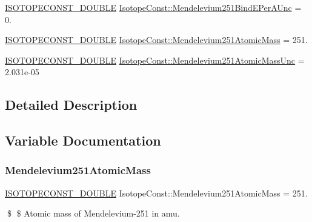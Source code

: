 \begin{DoxyCompactItemize}
\item 
\mbox{\hyperlink{group___isotope_const-_macros_ga8f45a7272ce02c0b4c65c44636ed719a}{I\+S\+O\+T\+O\+P\+E\+C\+O\+N\+S\+T\+\_\+\+D\+O\+U\+B\+LE}} \mbox{\hyperlink{group___isotope_const-_mendelevium-_md251_ga653bd7092f12763e25730c8b7e0113b8}{Isotope\+Const\+::\+Mendelevium251\+Bind\+E\+Per\+A\+Unc}} = 0.
\item 
\mbox{\hyperlink{group___isotope_const-_macros_ga8f45a7272ce02c0b4c65c44636ed719a}{I\+S\+O\+T\+O\+P\+E\+C\+O\+N\+S\+T\+\_\+\+D\+O\+U\+B\+LE}} \mbox{\hyperlink{group___isotope_const-_mendelevium-_md251_gaf84003f2ed6b6af5a3ca6591a2b3a733}{Isotope\+Const\+::\+Mendelevium251\+Atomic\+Mass}} = 251.
\item 
\mbox{\hyperlink{group___isotope_const-_macros_ga8f45a7272ce02c0b4c65c44636ed719a}{I\+S\+O\+T\+O\+P\+E\+C\+O\+N\+S\+T\+\_\+\+D\+O\+U\+B\+LE}} \mbox{\hyperlink{group___isotope_const-_mendelevium-_md251_ga7b61f57baacad898c83fb0f0a25c0f25}{Isotope\+Const\+::\+Mendelevium251\+Atomic\+Mass\+Unc}} = 2.\+031e-\/05
\end{DoxyCompactItemize}


\subsection{Detailed Description}


\subsection{Variable Documentation}
\mbox{\label{group___isotope_const-_mendelevium-_md251_gaf84003f2ed6b6af5a3ca6591a2b3a733}} 
\subsubsection{\texorpdfstring{Mendelevium251\+Atomic\+Mass}{Mendelevium251AtomicMass}}
{\footnotesize\ttfamily \mbox{\hyperlink{group___isotope_const-_macros_ga8f45a7272ce02c0b4c65c44636ed719a}{I\+S\+O\+T\+O\+P\+E\+C\+O\+N\+S\+T\+\_\+\+D\+O\+U\+B\+LE}} Isotope\+Const\+::\+Mendelevium251\+Atomic\+Mass = 251.}

\$ \$ Atomic mass of Mendelevium-\/251 in amu. \mbox{\label{group___isotope_const-_mendelevium-_md251_ga7b61f57baacad898c83fb0f0a25c0f25}} 
